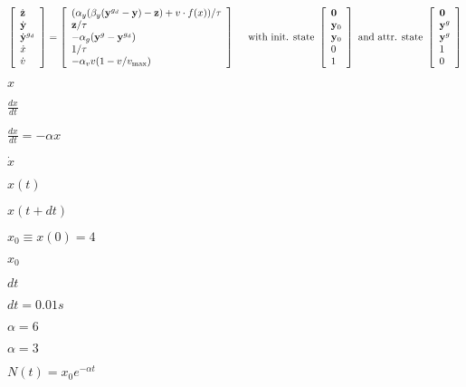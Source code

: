 \documentclass{article}
\begin{document}
\begin{eqnarray*} \left[ \begin{array}{l} {\dot{\mathbf{z}}} \\ {\dot{\mathbf{y}}} \\ {\dot{\mathbf{y}}^{g_d}} \\ {\dot{x}} \\ {\dot{v}} \end{array} \right] = \left[ \begin{array}{l} (\alpha_y (\beta_y({\mathbf{y}}^{g_d}-\mathbf{y})-\mathbf{z}) + v\cdot f(x))/\tau \\ \mathbf{z}/\tau \\ -\alpha_g({\mathbf{y}^g-\mathbf{y}^{g_d}}) \\ 1/\tau \\ -\alpha_v v (1-v/v_{\mbox{\scriptsize max}}) \end{array} \right] \mbox{~~~~with init. state~} \left[ \begin{array}{l} \mathbf{0} \\ \mathbf{y}_0 \\ \mathbf{y}_0 \\ 0 \\ 1 \end{array} \right] \mbox{~and attr. state~} \left[ \begin{array}{l} \mathbf{0} \\ \mathbf{y}^g \\ \mathbf{y}^g \\ 1 \\ 0 \end{array} \right] \end{eqnarray*}
\pagebreak

$x$
\pagebreak

$\frac{dx}{dt}$
\pagebreak

$ \frac{dx}{dt} = -\alpha x$
\pagebreak

$\dot{x}$
\pagebreak

$ x(t) $
\pagebreak

$x(t+dt)$
\pagebreak

$x_0\equiv x(0)=4$
\pagebreak

$ x_0$
\pagebreak

$dt$
\pagebreak

$dt=0.01s$
\pagebreak

$\alpha=6$
\pagebreak

$\alpha=3$
\pagebreak

$N(t) = x_0e^{-\alpha t}$
\pagebreak
\end{document}
